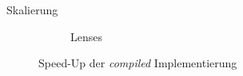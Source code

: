 \begin{frame}{Skalierung}
\begin{center}
\begin{figure}[h]
\begin{subfigure}[b]{0.45\textwidth}
				\caption{Lenses}
			\end{subfigure}
			\caption{Speed-Up der \textit{compiled} Implementierung}
		\end{figure}
	\end{center}
\end{frame}
